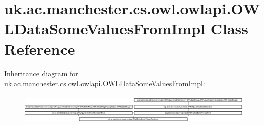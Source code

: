 \hypertarget{classuk_1_1ac_1_1manchester_1_1cs_1_1owl_1_1owlapi_1_1_o_w_l_data_some_values_from_impl}{\section{uk.\-ac.\-manchester.\-cs.\-owl.\-owlapi.\-O\-W\-L\-Data\-Some\-Values\-From\-Impl Class Reference}
\label{classuk_1_1ac_1_1manchester_1_1cs_1_1owl_1_1owlapi_1_1_o_w_l_data_some_values_from_impl}
}
Inheritance diagram for uk.\-ac.\-manchester.\-cs.\-owl.\-owlapi.\-O\-W\-L\-Data\-Some\-Values\-From\-Impl\-:\begin{figure}[H]
\begin{center}
\leavevmode
\includegraphics[height=1.454545cm]{classuk_1_1ac_1_1manchester_1_1cs_1_1owl_1_1owlapi_1_1_o_w_l_data_some_values_from_impl}
\end{center}
\end{figure}
